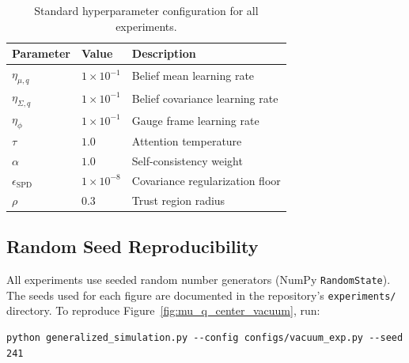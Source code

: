 \documentclass[twoside,11pt]{article}
\begin{document}
\begin{table}[h]
\centering
\renewcommand{\arraystretch}{1.2}
\setlength{\tabcolsep}{6pt}
\begin{tabularx}{\textwidth}{lll}
\hline
\textbf{Parameter} & \textbf{Value} & \textbf{Description} \\
\hline
$\eta_{\mu,q}$ & $1 \times 10^{-1}$ & Belief mean learning rate \\
$\eta_{\Sigma,q}$ & $1 \times 10^{-1}$ & Belief covariance learning rate \\
$\eta_\phi$ & $1 \times 10^{-1}$ & Gauge frame learning rate \\
$\tau$ & $1.0$ & Attention temperature \\
$\alpha$ & $1.0$ & Self-consistency weight \\
$\epsilon_{\text{SPD}}$ & $1 \times 10^{-8}$ & Covariance regularization floor \\
$\rho$ & $0.3$ & Trust region radius \\
\hline
\end{tabularx}
\caption{Standard hyperparameter configuration for all experiments.}
\label{tab:hyperparams}
\end{table}

\subsection{Random Seed Reproducibility}
All experiments use seeded random number generators (NumPy \texttt{RandomState}). 
The seeds used for each figure are documented in the repository's
\texttt{experiments/} directory. To reproduce Figure~\ref{fig:mu_q_center_vacuum}, run:

\begin{lstlisting}
python generalized_simulation.py --config configs/vacuum_exp.py --seed 241
\end{lstlisting}





\end{document}
